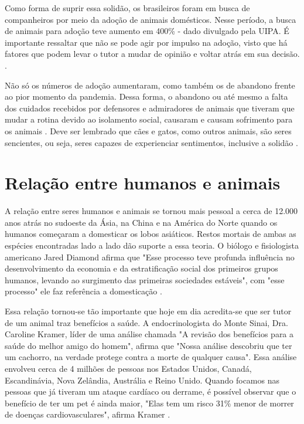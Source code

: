 Como forma de suprir essa solidão, os brasileiros foram em busca de companheiros por meio da adoção de animais domésticos. Nesse período, a busca de animais para adoção teve aumento em 400\% - dado divulgado pela \ac {UIPA}. É importante ressaltar que não se pode agir por impulso na adoção, visto que há fatores que podem levar o tutor a mudar de opinião e voltar atrás em sua decisão.
\cite{usp}. 

Não só os números de adoção aumentaram, como também os de abandono frente ao pior momento da pandemia. Dessa forma, o abandono ou até mesmo a falta dos cuidados recebidos por defensores e admiradores de animais que tiveram que mudar a rotina devido ao isolamento social, causaram e causam sofrimento para os animais \cite[p. 34-35]{isolamento-animais}. Deve ser lembrado que cães e gatos, como outros animais, são seres sencientes, ou seja, seres capazes de experienciar sentimentos, inclusive a solidão \cite{seres}.

\section{Relação entre humanos e animais}

A relação entre seres humanos e animais se tornou mais pessoal a cerca de 12.000 anos atrás no sudoeste da Ásia, na China e na América do Norte quando os humanos começaram a domesticar os lobos asiáticos. Restos mortais de ambas as espécies encontradas lado a lado dão suporte a essa teoria. O biólogo e fisiologista americano Jared Diamond afirma que "Esse processo teve profunda influência no desenvolvimento da economia e da estratificação social dos primeiros grupos humanos, levando ao surgimento das primeiras sociedades estáveis", com "esse processo" \space ele faz referência a domesticação \cite{lobos}.

Essa relação tornou-se tão importante que hoje em dia acredita-se que ser tutor de um animal traz benefícios a saúde. A endocrinologista do Monte Sinai, Dra. Caroline Kramer, líder de uma análise chamada "A revisão dos benefícios para a saúde do melhor amigo do homem", afirma que "Nossa análise descobriu que ter um cachorro, na verdade protege contra a morte de qualquer causa". Essa análise envolveu cerca de 4 milhões de pessoas nos Estados Unidos, Canadá, Escandinávia, Nova Zelândia, Austrália e Reino Unido. Quando focamos nas pessoas que já tiveram um ataque cardíaco ou derrame, é possível observar que o benefício de ter um pet é ainda maior, "Elas tem um risco 31\% menor de morrer de doenças cardiovasculares", afirma Kramer \cite{cardio}.

